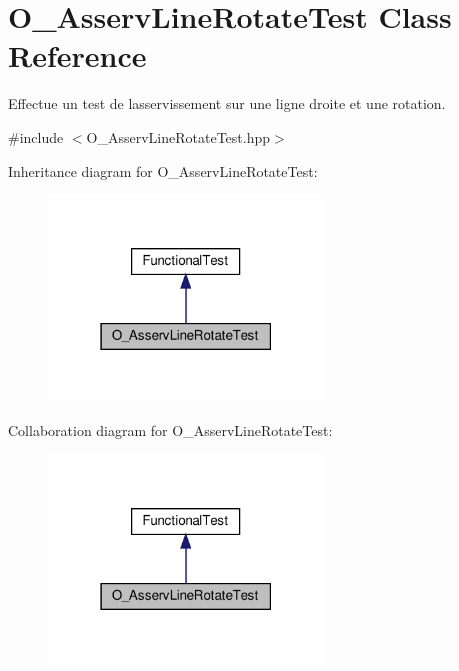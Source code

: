 \hypertarget{classO__AsservLineRotateTest}{}\section{O\+\_\+\+Asserv\+Line\+Rotate\+Test Class Reference}
\label{classO__AsservLineRotateTest}


Effectue un test de l\textquotesingle{}asservissement sur une ligne droite et une rotation.  




{\ttfamily \#include $<$O\+\_\+\+Asserv\+Line\+Rotate\+Test.\+hpp$>$}



Inheritance diagram for O\+\_\+\+Asserv\+Line\+Rotate\+Test\+:
\nopagebreak
\begin{figure}[H]
\begin{center}
\leavevmode
\includegraphics[width=207pt]{classO__AsservLineRotateTest__inherit__graph}
\end{center}
\end{figure}


Collaboration diagram for O\+\_\+\+Asserv\+Line\+Rotate\+Test\+:
\nopagebreak
\begin{figure}[H]
\begin{center}
\leavevmode
\includegraphics[width=207pt]{classO__AsservLineRotateTest__coll__graph}
\end{center}
\end{figure}
